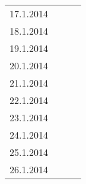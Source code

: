 \begin{tabular}{r l p{} l}
\rowcolor{lgray}   17.1.2014 &               &  &  \\
\rowcolor{white}   18.1.2014 &               &  &  \\
\rowcolor{lgray}   19.1.2014 &               &  &  \\
\rowcolor{white}   20.1.2014 &               &  &  \\
\rowcolor{lgray}   21.1.2014 &               &  &  \\
\rowcolor{white}   22.1.2014 &               &  &  \\
\rowcolor{lgray}   23.1.2014 &               &  &  \\
\rowcolor{white}   24.1.2014 &               &  &  \\
\rowcolor{lgray}   25.1.2014 &               &  &  \\
\rowcolor{white}   26.1.2014 &               &  &  \\
\end{tabular}

